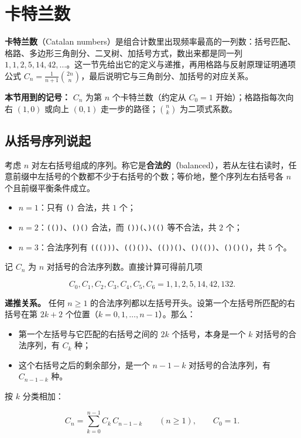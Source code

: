 \section{卡特兰数}


\textbf{卡特兰数}（Catalan numbers）是组合计数里出现频率最高的一列数：括号匹配、格路、多边形三角剖分、二叉树、加括号方式，数出来都是同一列 $1,1,2,5,14,42,\dots$。这一节先给出它的定义与递推，再用格路与反射原理证明通项公式 $C_n=\frac1{n+1}\binom{2n}{n}$，最后说明它与三角剖分、加括号的对应关系。

\textbf{本节用到的记号：} $C_n$ 为第 $n$ 个卡特兰数（约定从 $C_0=1$ 开始）；格路指每次向右 $(1,0)$ 或向上 $(0,1)$ 走一步的路径；$\binom nk$ 为二项式系数。

\subsection{从括号序列说起}


考虑 $n$ 对左右括号组成的序列。称它是\textbf{合法的}（balanced），若从左往右读时，任意前缀中左括号的个数都不少于右括号的个数；等价地，整个序列左右括号各 $n$ 个且前缀平衡条件成立。

\begin{itemize}
\item $n=1$：只有 \texttt{()} 合法，共 $1$ 个；
\item $n=2$：\texttt{(())}、\texttt{()()} 合法，而 \texttt{())(}、\texttt{)(()} 等不合法，共 $2$ 个；
\item $n=3$：合法序列有 \texttt{((()))}、\texttt{(()())}、\texttt{(())()}、\texttt{()(())}、\texttt{()()()}，共 $5$ 个。
\end{itemize}


记 $C_n$ 为 $n$ 对括号的合法序列数。直接计算可得前几项

\[
C_0,C_1,C_2,C_3,C_4,C_5,C_6=1,1,2,5,14,42,132.
\]

\textbf{递推关系。} 任何 $n\ge1$ 的合法序列都以左括号开头。设第一个左括号所匹配的右括号在第 $2k+2$ 个位置（$k=0,1,\dots,n-1$）。那么：

\begin{itemize}
\item 第一个左括号与它匹配的右括号之间的 $2k$ 个括号，本身是一个 $k$ 对括号的合法序列，有 $C_k$ 种；
\item 这个右括号之后的剩余部分，是一个 $n-1-k$ 对括号的合法序列，有 $C_{n-1-k}$ 种。
\end{itemize}


按 $k$ 分类相加：

\[
C_n=\sum_{k=0}^{n-1}C_k\,C_{n-1-k}\qquad(n\ge1),\qquad C_0=1.
\]

